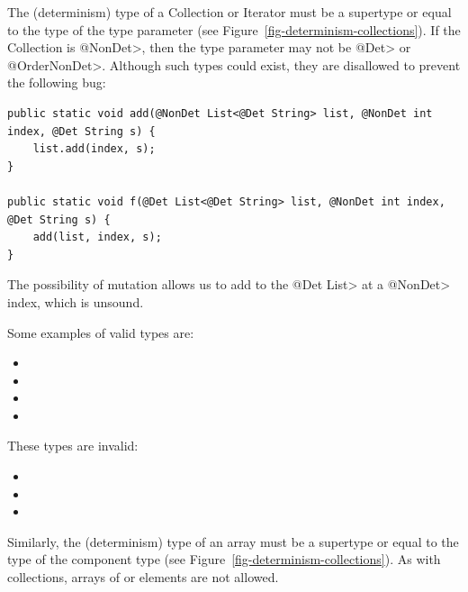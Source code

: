 The (determinism) type of a Collection or Iterator must be a supertype or equal to
the type of the type parameter (see Figure~\ref{fig-determinism-collections}).
If the Collection is \<@NonDet>, then the type parameter may not be
\<@Det> or \<@OrderNonDet>. Although such types could exist, they are
disallowed to prevent the following bug:

\begin{verbatim}
public static void add(@NonDet List<@Det String> list, @NonDet int index, @Det String s) {
    list.add(index, s);
}

public static void f(@Det List<@Det String> list, @NonDet int index, @Det String s) {
    add(list, index, s);
}
\end{verbatim}

The possibility of mutation allows us to add to the \<@Det List> at a
\<@NonDet> index, which is unsound.


Some examples of valid types are:
\begin{itemize}
    \item {}
    \item {}
    \item {}
    \item {}
\end{itemize}

These types are invalid:
\begin{itemize}
    \item {}
    \item {}
    \item {}
\end{itemize}

Similarly, the (determinism) type of an array must be a supertype or equal to
the type of the component type (see Figure~\ref{fig-determinism-collections}).
As with collections,  arrays of  or 
elements are not allowed.

